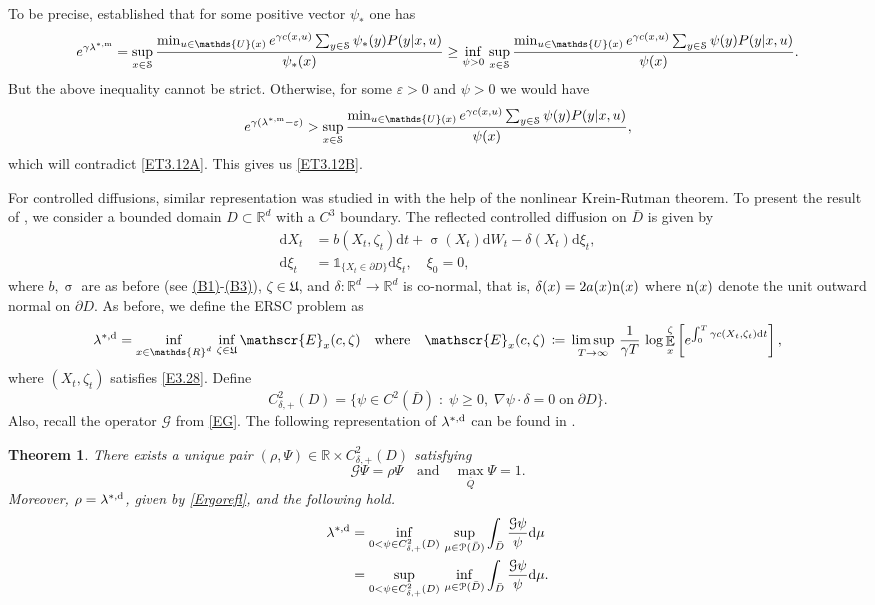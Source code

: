 \documentclass[notitlepage,11pt,reqno]{amsart}
\numberwithin{equation}{section}
\theoremstyle{plain}
\newtheorem{theorem}{Theorem}[section]
\theoremstyle{definition}
\theoremstyle{remark}
\newcommand{\Ind}{\mathds{1}}       %
\newcommand{\Act}{{\mathds{U}}}
\newcommand{\sE}{{\mathscr{E}}}     %
\newcommand{\cG}{{\mathcal{G}}}     %
\newcommand{\Pm}{{\mathcal{P}}}     %
\newcommand{\cS}{{\mathcal{S}}}     %
\newcommand{\Uadm}{\mathfrak{U}}
\newcommand{\lamstrdm}{\lambda^{*,{\rm m}}}
\newcommand{\lamstrdf}{\lambda^{*,{\rm d}}}
\newcommand{\RR}{\mathds{R}} %
\newcommand{\Rd}{{\mathds{R}^{d}}}
\DeclareMathOperator{\Exp}{\mathbb{E}} %
\newcommand{\D}{\mathrm{d}} %
\newcommand{\grad}{\nabla}
\newcommand{\df}{\coloneqq}
\begin{document}
To be precise, \cite{MR3846082} established that for some positive vector $\psi_*$ one has
$$e^{\gamma\lamstrdm}=\sup_{x\in\cS} \frac{\min_{u\in\Act(x)} e^{\gamma c(x, u)}\sum_{y\in\cS}\psi_*(y) P(y|x, u)}{\psi_*(x)}
\geq \inf_{\psi>0}\, \sup_{x\in\cS} \frac{\min_{u\in\Act(x)} e^{\gamma c(x, u)}\sum_{y\in\cS}\psi(y) P(y|x, u)}{\psi(x)}.$$
But the above inequality cannot be strict. Otherwise, for some $\varepsilon>0$ and $\psi>0$ we would have
$$e^{\gamma(\lamstrdm-\varepsilon)}>\sup_{x\in\cS} \frac{\min_{u\in\Act(x)} e^{\gamma c(x, u)}\sum_{y\in\cS}\psi(y) P(y|x, u)}{\psi(x)},$$
which will contradict \eqref{ET3.12A}. This gives us \eqref{ET3.12B}.

For controlled diffusions, similar representation was studied in \cite{MR3571250} with the help of the nonlinear Krein-Rutman theorem. To present the result of \cite{MR3571250}, we consider
a bounded domain $D\subset \Rd$ with a $C^3$ boundary. The reflected controlled diffusion on $\bar{D}$ is given by
\begin{equation}\label{E3.28}
\begin{split}
\D{X}_t & = b(X_t, \zeta_t) \D{t} + \upsigma(X_t) \D{W}_t - \delta(X_t)\D\xi_t,
\\
\D\xi_t&= \Ind_{\{X_t\in\partial D\}} \D\xi_t,\quad \xi_0=0,
\end{split}
\end{equation}
where $b , \upsigma$ are as before (see \hyperlink{B1}{(B1)}-\hyperlink{B3}{(B3)}), $\zeta\in\Uadm$, and $\delta:\Rd\to\Rd$ is co-normal, that is,
$\delta(x)=2a(x){\rm n}(x)$ where ${\rm n}(x)$ denote the unit outward normal on $\partial D$. As before, we define the ERSC problem as
\begin{equation}\label{Ergorefl}
\lamstrdf= \inf_{x\in\Rd}\,\inf_{\zeta\in\Uadm} \sE_x(c, \zeta) \quad \text{where}\quad \sE_x(c, \zeta) \,\df\, \limsup_{ T\to\infty} \, \frac{1}{\gamma T}\,
\log \Exp_x^{\zeta} \left[e^{\int_{ 0}^{T} \gamma c(X_t, \zeta_t) \D{t}}\right],
\end{equation}
where $(X_t, \zeta_t)$ satisfies \eqref{E3.28}. Define
$$C^2_{\delta, +}(D)=\{\psi\in C^2(\bar{D})\; :\; \psi\geq 0, \; \grad \psi\cdot\delta =0\; \text{on}\; \partial D\}.$$
Also, recall the operator $\cG$ from \eqref{EG}. The following representation of $\lamstrdf$ can be found in \cite[Theorem~2.1]{MR3571250}.
\begin{theorem}\label{T3.13}
There exists a unique pair $(\rho, \Psi)\in\RR\times C^2_{\delta, +}(D)$ satisfying
$$\cG\Psi=\rho\Psi\quad \text{and}\quad \max_{\bar{Q}}\Psi=1.$$
Moreover, $\rho=\lamstrdf$, given by \eqref{Ergorefl}, and the following hold.
\begin{align*}
\lamstrdf & = \inf_{0<\psi\in C^2_{\delta, +}(D)}\, \sup_{\mu\in\Pm(\bar{D})} \int_{\bar{D}} \frac{\cG \psi}{\psi}\D\mu
\\
&= \sup_{0<\psi\in C^2_{\delta, +}(D)}\, \inf_{\mu\in\Pm(\bar{D})} \int_{\bar{D}} \frac{\cG \psi}{\psi}\D\mu.
\end{align*}
\end{theorem}
\end{document}
